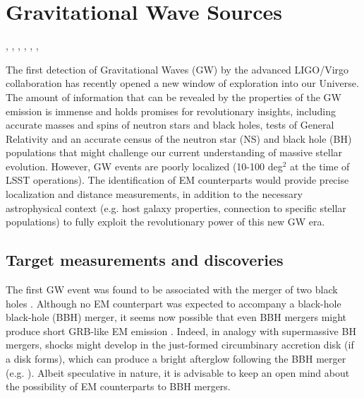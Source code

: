 %
%

\section{Gravitational Wave Sources}
\def\secname{gw}\label{sec:\secname}

,
,
,
,
,
,

The first detection of Gravitational Waves (GW) by the advanced
LIGO/Virgo collaboration \citep{Abbott16, Abbott09, Acernese08} has
recently opened a new window of exploration into our Universe. The
amount of information that can be revealed by the properties of the GW
emission is immense and holds promises for revolutionary insights,
including accurate masses and spins of neutron stars and black holes,
tests of General Relativity and an accurate census of the neutron star
(NS) and black hole (BH) populations that might challenge our current
understanding of massive stellar evolution. However, GW events are
poorly localized (10-100 deg$^2$ at the time of LSST operations). The
identification of EM counterparts would provide precise localization and
distance measurements, in addition to the necessary astrophysical
context (e.g. host galaxy properties, connection to specific stellar
populations) to fully exploit the revolutionary power of this new GW
era.


\subsection{Target measurements and discoveries}
\label{sec:\secname:targets}

The first GW event was found to be associated with the merger of two
black holes \citep{Abbott16,Abbott16b}. Although no EM counterpart was
expected to accompany a black-hole black-hole (BBH) merger, it seems now
possible that even BBH mergers  might produce short GRB-like EM emission
\citep{Connaughton16,Loeb16,Zhang16,Perna16,Stone16}. Indeed, in
analogy with supermassive BH mergers, shocks might develop in the
just-formed circumbinary accretion disk (if a disk forms), which can
produce a bright afterglow following the BBH merger (e.g.
\citealt{Lippai08,Corrales10,Schnittman13}). Albeit speculative in
nature, it is advisable to keep an open mind about the possibility of EM
counterparts to BBH mergers.

